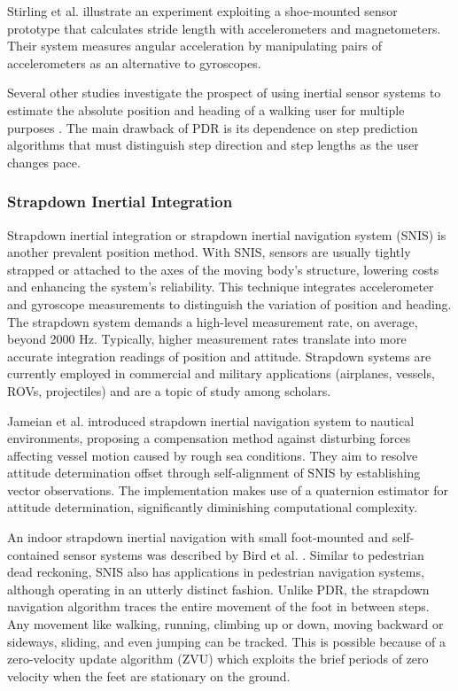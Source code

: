 Stirling et al. \cite{stirling2003innovative} illustrate an experiment exploiting a shoe-mounted sensor prototype that calculates stride length with accelerometers and magnetometers. Their system measures angular acceleration by manipulating pairs of accelerometers as an alternative to gyroscopes.

Several other studies investigate the prospect of using inertial sensor systems to estimate the absolute position and heading of a walking user for multiple purposes \cite{steinhoff2010dead}\cite{weinberg2002using}\cite{kim2004step} \cite{collin2002mems}. The main drawback of PDR is its dependence on step prediction algorithms that must distinguish step direction and step lengths as the user changes pace.

\subsubsection{Strapdown Inertial Integration}

Strapdown inertial integration or strapdown inertial navigation system (SNIS) is another prevalent position method. With SNIS, sensors are usually tightly strapped or attached to the axes of the moving body's structure, lowering costs and enhancing the system's reliability. This technique integrates accelerometer and gyroscope measurements to distinguish the variation of position and heading. The strapdown system demands a high-level measurement rate, on average, beyond 2000 Hz. Typically, higher measurement rates translate into more accurate integration readings of position and attitude. Strapdown systems are currently employed in commercial and military applications (airplanes, vessels, ROVs, projectiles) and are a topic of study among scholars.

Jameian et al. \cite{jameian2019robust}  introduced strapdown inertial navigation system to nautical environments, proposing a compensation method against disturbing forces affecting vessel motion caused by rough sea conditions. They aim to resolve attitude determination offset through self-alignment of SNIS by establishing vector observations. The implementation makes use of a quaternion estimator for attitude determination, significantly diminishing computational complexity.

An indoor strapdown inertial navigation with small foot-mounted and self-contained sensor systems was described by Bird et al. \cite{bird2011indoor}. Similar to pedestrian dead reckoning, SNIS also has applications in pedestrian navigation systems, although operating in an utterly distinct fashion. Unlike PDR, the strapdown navigation algorithm traces the entire movement of the foot in between steps. Any movement like walking, running, climbing up or down, moving backward or sideways, sliding, and even jumping can be tracked. This is possible because of a zero-velocity update algorithm (ZVU) which exploits the brief periods of zero velocity when the feet are stationary on the ground.

